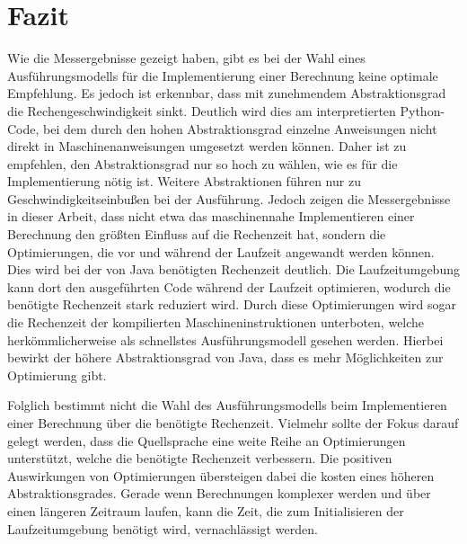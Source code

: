 \documentclass[11pt, parskip=half]{scrartcl}       %
\begin{document}
\section{Fazit}

Wie die Messergebnisse gezeigt haben, gibt es bei der Wahl eines Ausführungsmodells für die Implementierung einer Berechnung keine optimale Empfehlung.
Es jedoch ist erkennbar, dass mit zunehmendem Abstraktionsgrad die Rechengeschwindigkeit sinkt.
Deutlich wird dies am interpretierten Python-Code, bei dem durch den hohen Abstraktionsgrad einzelne Anweisungen nicht direkt in Maschinenanweisungen umgesetzt werden können.
Daher ist zu empfehlen, den Abstraktionsgrad nur so hoch zu wählen, wie es für die Implementierung nötig ist.
Weitere Abstraktionen führen nur zu Geschwindigkeitseinbußen bei der Ausführung.
Jedoch zeigen die Messergebnisse in dieser Arbeit, dass nicht etwa das maschinennahe Implementieren einer Berechnung den größten Einfluss auf die Rechenzeit hat, sondern die Optimierungen, die vor und während der Laufzeit angewandt werden können.
Dies wird bei der von Java benötigten Rechenzeit deutlich.
Die Laufzeitumgebung kann dort den ausgeführten Code während der Laufzeit optimieren, wodurch die benötigte Rechenzeit stark reduziert wird.
Durch diese Optimierungen wird sogar die Rechenzeit der kompilierten Maschineninstruktionen unterboten, welche herkömmlicherweise als schnellstes Ausführungsmodell gesehen werden.
Hierbei bewirkt der höhere Abstraktionsgrad von Java, dass es mehr Möglichkeiten zur Optimierung gibt.

Folglich bestimmt nicht die Wahl des Ausführungsmodells beim Implementieren einer Berechnung über die benötigte Rechenzeit.
Vielmehr sollte der Fokus darauf gelegt werden, dass die Quellsprache eine weite Reihe an Optimierungen unterstützt, welche die benötigte Rechenzeit verbessern.
Die positiven Auswirkungen von Optimierungen übersteigen dabei die kosten eines höheren Abstraktionsgrades.
Gerade wenn Berechnungen komplexer werden und über einen längeren Zeitraum laufen, kann die Zeit, die zum Initialisieren der Laufzeitumgebung benötigt wird, vernachlässigt werden.


\newpage

{}

\end{document}
